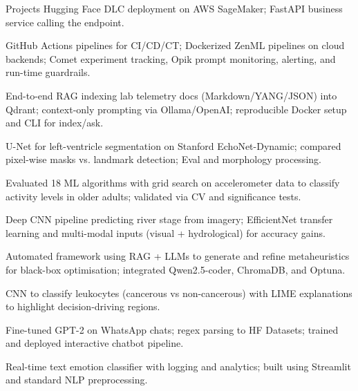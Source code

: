\begin{rubricnorepeat}{Projects}
Hugging Face DLC deployment on AWS SageMaker; FastAPI business service calling the endpoint.
\hfill \href{https://github.com/musel25/sagemaker-inference-microservice}{\faGithub}

\entry*[LLMOps: CI/CD/CT]
GitHub Actions pipelines for CI/CD/CT; Dockerized ZenML pipelines on cloud backends; Comet experiment tracking, Opik prompt monitoring, alerting, and run-time guardrails.\hfill \href{https://github.com/musel25/llmops-cicd-monitoring}{\faGithub}

End-to-end RAG indexing lab telemetry docs (Markdown/YANG/JSON) into Qdrant; context-only prompting via Ollama/OpenAI; reproducible Docker setup and CLI for index/ask.\hfill 
\href{https://github.com/musel25/telemetry-rag}{\faGithub}

U-Net for left-ventricle segmentation on Stanford EchoNet-Dynamic; compared pixel-wise masks vs. landmark detection; Eval and morphology processing.\hfill\href{https://github.com/Tec-AI-23/EchoNetDynamic}{\faGithub}

Evaluated 18 ML algorithms with grid search on accelerometer data to classify activity levels in older adults; validated via CV and significance tests.\hfill \href{https://github.com/Tec-AI-23/HAR70}{\faGithub}

Deep CNN pipeline predicting river stage from imagery; EfficientNet transfer learning and multi-modal inputs (visual + hydrological) for accuracy gains.\hfill \href{https://github.com/musel25/research_deep_learning}{\faGithub}

Automated framework using RAG + LLMs to generate and refine metaheuristics for black-box optimisation; integrated Qwen2.5-coder, ChromaDB, and Optuna.\hfill \href{https://github.com/musel25/llm-metaheuristics}{\faGithub}

CNN to classify leukocytes (cancerous vs non-cancerous) with LIME explanations to highlight decision-driving regions.

Fine-tuned GPT-2 on WhatsApp chats; regex parsing to HF Datasets; trained and deployed interactive chatbot pipeline.\hfill \href{https://github.com/musel25/her_if_it_was_2025}{\faGithub}

Real-time text emotion classifier with logging and analytics; built using Streamlit and standard NLP preprocessing.\hfill \href{https://github.com/musel25/nlp_project}{\faGithub}



\end{rubricnorepeat}




